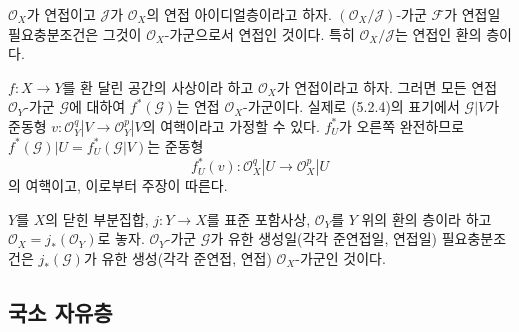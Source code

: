 \begin{env}[5.3.10]
\label{0.5.3.10-ko}
$\mathcal O_X$가 연접이고 $\mathcal J$가 $\mathcal O_X$의 연접
아이디얼층이라고 하자. $(\mathcal O_X/\mathcal J)$-가군
$\mathcal F$가 연접일 필요충분조건은 그것이 $\mathcal O_X$-가군으로서
연접인 것이다. 특히 $\mathcal O_X/\mathcal J$는 연접인 환의 층이다.
\end{env}

\begin{env}[5.3.11]
\label{0.5.3.11-ko}
$f:X\to Y$를 환 달린 공간의 사상이라 하고 $\mathcal O_X$가
연접이라고 하자. 그러면 모든 연접 $\mathcal O_Y$-가군
$\mathcal G$에 대하여 $f^*(\mathcal G)$는 연접
$\mathcal O_X$-가군이다. 실제로 (5.2.4)의 표기에서
$\mathcal G|V$가 준동형
$v:\mathcal O_Y^q|V\to\mathcal O_Y^p|V$의 여핵이라고 가정할 수 있다.
$f_U^*$가 오른쪽 완전하므로
$f^*(\mathcal G)|U=f_U^*(\mathcal G|V)$는 준동형
\[
  f_U^*(v):\mathcal O_X^q|U\longrightarrow\mathcal O_X^p|U
\]
의 여핵이고, 이로부터 주장이 따른다.
\end{env}

\begin{env}[5.3.12]
\label{0.5.3.12-ko}
$Y$를 $X$의 닫힌 부분집합, $j:Y\to X$를 표준 포함사상,
$\mathcal O_Y$를 $Y$ 위의 환의 층이라 하고
$\mathcal O_X=j_*(\mathcal O_Y)$로 놓자. $\mathcal O_Y$-가군
$\mathcal G$가 유한 생성일(각각 준연접일, 연접일) 필요충분조건은
$j_*(\mathcal G)$가 유한 생성(각각 준연접, 연접)
$\mathcal O_X$-가군인 것이다.
\end{env}

\subsection{국소 자유층}
\label{subsection:0.5.4-ko}

